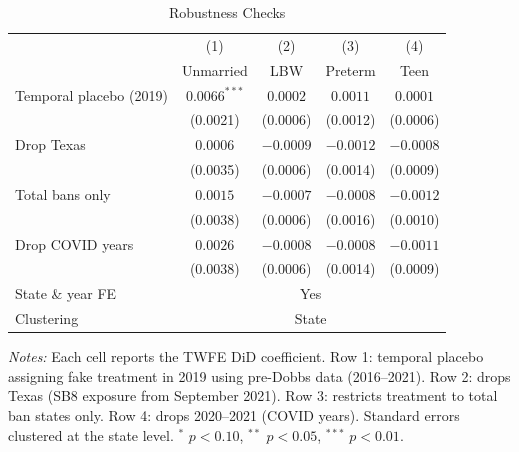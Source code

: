 \begin{table}[H]
\centering
\caption{Robustness Checks}
\begin{threeparttable}
\begin{tabular}{lcccc}
\toprule
 & (1) & (2) & (3) & (4) \\
 & Unmarried & LBW & Preterm & Teen \\
\midrule
Temporal placebo (2019) & $0.0066^{***}$ & $0.0002$ & $0.0011$ & $0.0001$ \\
 & (0.0021) & (0.0006) & (0.0012) & (0.0006) \\[0.3em]
Drop Texas & $0.0006$ & $-0.0009$ & $-0.0012$ & $-0.0008$ \\
 & (0.0035) & (0.0006) & (0.0014) & (0.0009) \\[0.3em]
Total bans only & $0.0015$ & $-0.0007$ & $-0.0008$ & $-0.0012$ \\
 & (0.0038) & (0.0006) & (0.0016) & (0.0010) \\[0.3em]
Drop COVID years & $0.0026$ & $-0.0008$ & $-0.0008$ & $-0.0011$ \\
 & (0.0038) & (0.0006) & (0.0014) & (0.0009) \\[0.3em]
\midrule
State \& year FE & \multicolumn{4}{c}{Yes} \\
Clustering & \multicolumn{4}{c}{State} \\
\bottomrule
\end{tabular}
\begin{tablenotes}[flushleft]
\small
\item \textit{Notes:} Each cell reports the TWFE DiD coefficient. Row 1: temporal placebo assigning fake treatment in 2019 using pre-Dobbs data (2016--2021). Row 2: drops Texas (SB8 exposure from September 2021). Row 3: restricts treatment to total ban states only. Row 4: drops 2020--2021 (COVID years). Standard errors clustered at the state level. $^{*}$ $p<0.10$, $^{**}$ $p<0.05$, $^{***}$ $p<0.01$.
\end{tablenotes}
\end{threeparttable}
\label{tab:robustness}
\end{table}
